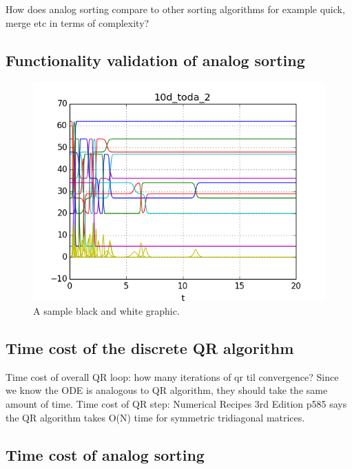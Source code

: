 How does analog sorting compare to other sorting algorithms for example quick, merge etc in terms of complexity?

\subsection{Functionality validation of analog sorting}
\begin{figure}
\centering
\includegraphics{../pyscripts/Graphs/10d_toda_2.png}
\caption{A sample black and white graphic.}
\end{figure}

\subsection{Time cost of the discrete QR algorithm}
Time cost of overall QR loop:
	how many iterations of qr til convergence?
	Since we know the ODE is analogous to QR algorithm, they should take the same amount of time.
Time cost of QR step:
	Numerical Recipes 3rd Edition p585 says the QR algorithm takes O(N) time for symmetric tridiagonal matrices.

\subsection{Time cost of analog sorting}

